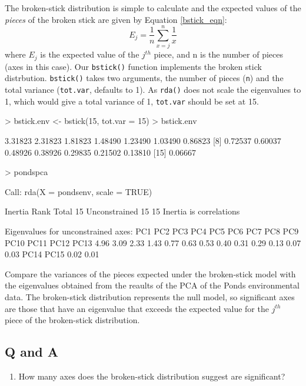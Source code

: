 \documentclass[a4paper,10pt]{article}
\newcommand{\rda}{\texttt{rda()}\xspace}
\begin{document}
The broken-stick distribution is simple to calculate and the expected values of the \emph{pieces} of the broken stick are given by Equation \ref{bstick_eqn}:
\begin{equation}
\label{bstick_eqn}
E_j=\frac{1}{n}\sum_{x=j}^n \frac{1}{x}
\end{equation}
where $E_j$ is the expected value of the $j^{th}$ piece, and n is the number of pieces (axes in this case). Our \texttt{bstick()} function implements the broken stick distrbution. \texttt{bstick()} takes two arguments, the number of pieces (\texttt{n}) and the total variance (\texttt{tot.var}, defaults to 1). As \rda does not scale the eigenvalues to 1, which would give a total variance of 1, \texttt{tot.var} should be set at 15.
\begin{Schunk}
\begin{Sinput}
> bstick.env <- bstick(15, tot.var = 15)
> bstick.env
\end{Sinput}
\begin{Soutput}
 [1] 3.31823 2.31823 1.81823 1.48490 1.23490 1.03490 0.86823
 [8] 0.72537 0.60037 0.48926 0.38926 0.29835 0.21502 0.13810
[15] 0.06667
\end{Soutput}
\begin{Sinput}
> pondspca
\end{Sinput}
\begin{Soutput}
Call: rda(X = pondsenv, scale = TRUE)

              Inertia Rank
Total              15     
Unconstrained      15   15
Inertia is correlations 

Eigenvalues for unconstrained axes:
 PC1  PC2  PC3  PC4  PC5  PC6  PC7  PC8  PC9 PC10 PC11 PC12 PC13 
4.96 3.09 2.33 1.43 0.77 0.63 0.53 0.40 0.31 0.29 0.13 0.07 0.03 
PC14 PC15 
0.02 0.01 
\end{Soutput}
\end{Schunk}

Compare the variances of the pieces expected under the broken-stick model with the eigenvalues obtained from the reaults of the PCA of the Ponds environmental data. The broken-stick distribution represents the null model, so significant axes are those that have an eigenvalue that exceeds the expected value for the $j^{th}$ piece of the broken-stick distribution.
\subsection*{Q and A}
\begin{enumerate}
\item How many axes does the broken-stick distribution suggest are significant?
\end{enumerate}
\end{document}
